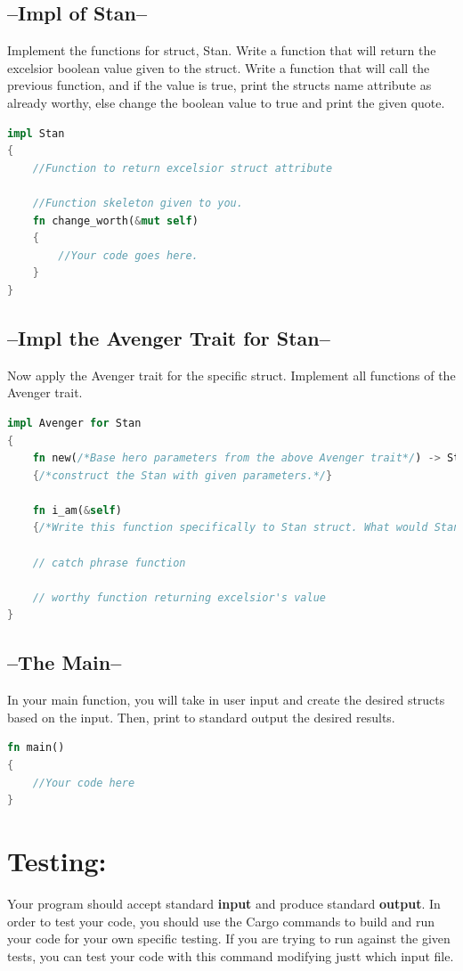 \documentclass[11pt]{article}
\begin{document}
\subsection*{--Impl of Stan--}
Implement the functions for struct, Stan. Write a function that will return the excelsior boolean value given to the struct. Write a function that will call the previous function, and if the value is true, print the structs name attribute as already worthy, else change the boolean value to true and print the given quote.

\begin{lstlisting}[language=rust]
impl Stan
{
    //Function to return excelsior struct attribute
    
    //Function skeleton given to you.
    fn change_worth(&mut self)
    {
        //Your code goes here.
    }
}
\end{lstlisting}
\newpage
\subsection*{--Impl the Avenger Trait for Stan--}
Now apply the Avenger trait for the specific struct. Implement all functions of the Avenger trait.
\begin{lstlisting}[language=rust]
impl Avenger for Stan
{
    fn new(/*Base hero parameters from the above Avenger trait*/) -> Stan
    {/*construct the Stan with given parameters.*/}
    
    fn i_am(&self)
    {/*Write this function specifically to Stan struct. What would Stan say?*/}
    
    // catch phrase function
    
    // worthy function returning excelsior's value
}
\end{lstlisting}

\subsection*{--The Main--}
In your main function, you will take in user input and create the desired structs based on the input. Then, print to standard output the desired results.

\begin{lstlisting}[language=rust]
fn main()
{
    //Your code here
}
\end{lstlisting}

\section*{Testing:}
Your program should accept standard \textbf{input} and produce standard \textbf{output}. In order to test your code, you should use the Cargo commands to build and run your code for your own specific testing. If you are trying to run against the given tests, you can test your code with this command modifying justt which input file.
\end{document}
